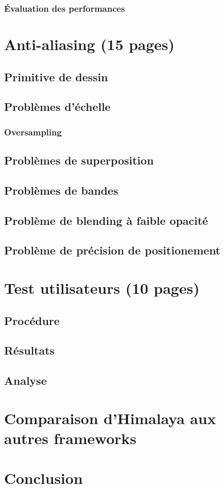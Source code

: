 		\subsection{Évaluation des performances}

\chapter{Anti-aliasing (15 pages) }
	\section{Primitive de dessin}
	\section{Problèmes d'échelle}
		\subsection{Oversampling}
	\section{Problèmes de superposition}
	\section{Problèmes de bandes}
	\section{Problème de blending à faible opacité}
	\section{Problème de précision de positionement}
\chapter{Test utilisateurs (10 pages) }
	\section{Procédure}
	\section{Résultats}
	\section{Analyse}
\chapter{Comparaison d'Himalaya aux autres frameworks}
\chapter{Conclusion}
